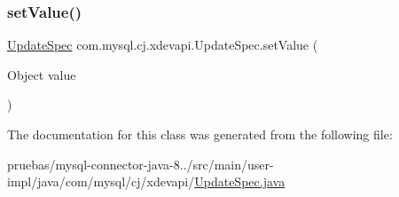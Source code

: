 \mbox{\label{classcom_1_1mysql_1_1cj_1_1xdevapi_1_1_update_spec_a277cb0b37a9c3329c25b65c2904f069c}} 
\subsubsection{\texorpdfstring{set\+Value()}{setValue()}}
{\footnotesize\ttfamily \mbox{\hyperlink{classcom_1_1mysql_1_1cj_1_1xdevapi_1_1_update_spec}{Update\+Spec}} com.\+mysql.\+cj.\+xdevapi.\+Update\+Spec.\+set\+Value (\begin{DoxyParamCaption}\item[{Object}]{value }\end{DoxyParamCaption})}



The documentation for this class was generated from the following file\+:\begin{DoxyCompactItemize}
\item 
pruebas/mysql-\/connector-\/java-\/8../src/main/user-\/impl/java/com/mysql/cj/xdevapi/\mbox{\hyperlink{_update_spec_8java}{Update\+Spec.\+java}}\end{DoxyCompactItemize}
